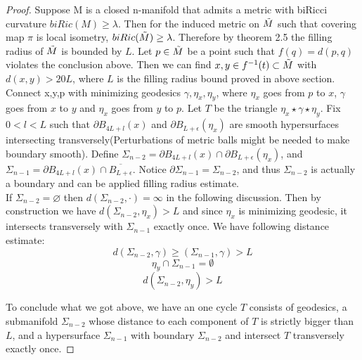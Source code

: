 \documentclass{amsart}
\theoremstyle{definition}
\theoremstyle{remark}
\numberwithin{equation}{section}
\begin{document}
\begin{proof}
Suppose M is a closed n-manifold that admits a metric with biRicci curvature $biRic(M)\geq \lambda$. Then for the induced metric on $\Tilde{M}$ such that covering map $\pi$ is local isometry, $biRic(\Tilde{M})\geq \lambda$. Therefore by theorem 2.5 the filling radius of $\Tilde{M}$ is bounded by $L$. Let $p\in \Tilde{M}$ be a point such that $f(q)=d(p,q)$ violates the conclusion above. Then we can find $x,y\in f^{-1}(t)\subset \Tilde{M}$ with $d(x,y)>20L$, where $L$ is the filling radius bound proved in above section. Connect x,y,p with minimizing geodesics $\gamma,\eta_{x},\eta_{y}$, where $\eta_{x}$ goes from $p$ to $x$, $\gamma$ goes from $x$ to $y$ and $\eta_{x}$ goes from $y$ to $p$. Let $T$ be the triangle $\eta_{x}\star\gamma\star\eta_{y}$. Fix $0<l<L$ such that $\partial B_{4L+l}(x)$ and $\partial B_{L+\epsilon}(\eta_{x})$ are smooth hypersurfaces intersecting transversely(Perturbations of metric balls might be needed to make boundary smooth). Define $\Sigma_{n-2}=\partial B_{4L+l}(x) \cap \partial B_{L+\epsilon}(\eta_{x})$, and $\Sigma_{n-1}=\partial B_{4L+l}(x) \cap \overline{B_{L+\epsilon}}$. Notice $\partial \Sigma_{n-1}=\Sigma_{n-2}$, and thus $\Sigma_{n-2}$ is actually a boundary and can be applied filling radius estimate.\\
If $\Sigma_{n-2}=\varnothing$ then $d(\Sigma_{n-2},\cdot)=\infty$ in the following discussion. Then by construction we have $d(\Sigma_{n-2},\eta_{x})>L$ and since $\eta_{x}$ is minimizing geodesic, it intersects transversely with $\Sigma_{n-1}$ exactly once. We have following distance estimate:\\
\begin{equation}
    d(\Sigma_{n-2},\gamma)\geq(\Sigma_{n-1},\gamma)>L
\end{equation}
\begin{equation}
    \eta_{y}\cap \Sigma_{n-1}=\emptyset
\end{equation}
\begin{equation}
    d(\Sigma_{n-2},\eta_{y})>L
\end{equation}

To conclude what we got above, we have an one cycle $T$ consists of geodesics, a submanifold $\Sigma_{n-2}$ whose distance to each component of $T$ is strictly bigger than $L$, and a hypersurface $\Sigma_{n-1}$ with boundary $\Sigma_{n-2}$ and intersect $T$ transversely exactly once. 


\end{proof}
\end{document}
